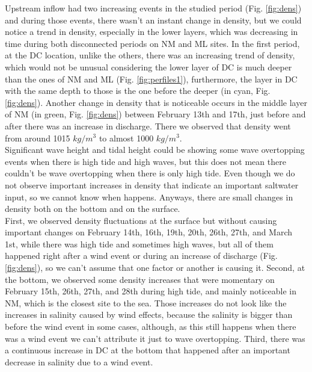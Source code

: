 \documentclass[tesis.tex]{subfiles}
\begin{document}
Upstream inflow had two increasing events in the studied period (Fig. \ref{fig:dens}) and during those events, there wasn't an instant change in density, but we could notice a trend in density, especially in the lower layers, which was decreasing in time during both disconnected periods on NM and ML sites. In the first period, at the DC location, unlike the others, there was an increasing trend of density, which would not be unusual considering the lower layer of DC is much deeper than the ones of NM and ML (Fig. \ref{fig:perfiles1}), furthermore, the layer in DC with the same depth to those is the one before the deeper (in cyan, Fig. \ref{fig:dens}). Another change in density that is noticeable occurs in the middle layer of NM (in green, Fig. \ref{fig:dens}) between February 13th and 17th, just before and after there was an increase in discharge. There we observed that density went from around 1015 $kg/m^3$ to almost 1000 $kg/m^3$. \\

Significant wave height and tidal height could be showing some wave overtopping events when there is high tide and high waves, but this does not mean there couldn't be wave overtopping when there is only high tide. Even though we do not observe important increases in density that indicate an important saltwater input, so we cannot know when happens. Anyways, there are small changes in density both on the bottom and on the surface.\\

First, we observed density fluctuations at the surface but without causing important changes on February 14th, 16th, 19th, 20th, 26th, 27th, and March 1st, while there was high tide and sometimes high waves, but all of them happened right after a wind event or during an increase of discharge (Fig. \ref{fig:dens}), so we can't assume that one factor or another is causing it. Second, at the bottom, we observed some density increases that were momentary on February 15th, 26th, 27th, and 28th during high tide, and mainly noticeable in NM, which is the closest site to the sea. Those increases do not look like the increases in salinity caused by wind effects, because the salinity is bigger than before the wind event in some cases, although, as this still happens when there was a wind event we can't attribute it just to wave overtopping. Third, there was a continuous increase in DC at the bottom that happened after an important decrease in salinity due to a wind event.\\
\end{document}

